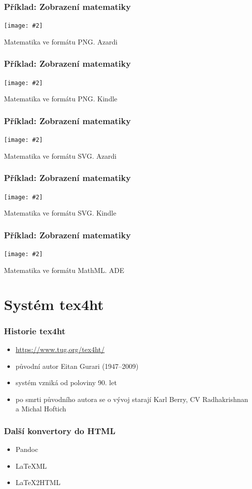 \documentclass[czech]{beamer}
\newcommand\myfig[3][width=.9\textwidth]{%
  \figure\texttt{[image: \#2]}%
  \caption{#3}%
\endfigure}
\begin{document}
\begin{frame}
  \frametitle{Příklad: Zobrazení matematiky}
  {\myfig{examples/png-epub.png}{Matematika ve formátu PNG. Azardi}}
\end{frame}
\begin{frame}
  \frametitle{Příklad: Zobrazení matematiky}
  {\myfig{examples/png-mobi.png}{Matematika ve formátu PNG. Kindle}}
\end{frame}
\begin{frame}
  \frametitle{Příklad: Zobrazení matematiky}
  \myfig{examples/svg-epub.png}{Matematika ve formátu SVG. Azardi}
\end{frame}
\begin{frame}
  \frametitle{Příklad: Zobrazení matematiky}
  \myfig[height=0.6\paperheight]{examples/svg-mobi.png}{Matematika ve formátu SVG. Kindle}
\end{frame}
\begin{frame}
  \frametitle{Příklad: Zobrazení matematiky}
  \myfig{examples/mathml-ade.png}{Matematika ve formátu MathML. ADE}
\end{frame}

  \section{Systém tex4ht}
\begin{frame}
  \frametitle{Historie tex4ht}
  \begin{itemize}
    \item \url{https://www.tug.org/tex4ht/}
    \item původní autor Eitan Gurari (1947--2009)
    \item systém vzniká od poloviny 90. let
    \item po smrti původního autora se o vývoj starají Karl Berry, CV Radhakrishnan a Michal Hoftich
  \end{itemize}
\end{frame}

\begin{frame}
  \frametitle{Další konvertory do HTML}
  \begin{itemize}
    \item Pandoc
    \item LaTeXML
    \item LaTeX2HTML
  \end{itemize}
\end{frame}
\end{document}

